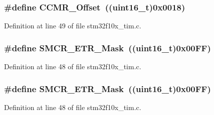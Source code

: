 \subsubsection[{\texorpdfstring{C\+C\+M\+R\+\_\+\+Offset}{CCMR_Offset}}]{\setlength{\rightskip}{0pt plus 5cm}\#define C\+C\+M\+R\+\_\+\+Offset~(({\bf uint16\+\_\+t})0x0018)}\hypertarget{group___t_i_m___private___defines_ga76469c9f56da4e7705336a6ac0248196}{}\label{group___t_i_m___private___defines_ga76469c9f56da4e7705336a6ac0248196}


Definition at line 49 of file stm32f10x\+\_\+tim.\+c.

\subsubsection[{\texorpdfstring{S\+M\+C\+R\+\_\+\+E\+T\+R\+\_\+\+Mask}{SMCR_ETR_Mask}}]{\setlength{\rightskip}{0pt plus 5cm}\#define S\+M\+C\+R\+\_\+\+E\+T\+R\+\_\+\+Mask~(({\bf uint16\+\_\+t})0x00\+F\+F)}\hypertarget{group___t_i_m___private___defines_ga43819484b70fd8f2f2aa02d4131c9841}{}\label{group___t_i_m___private___defines_ga43819484b70fd8f2f2aa02d4131c9841}


Definition at line 48 of file stm32f10x\+\_\+tim.\+c.

\subsubsection[{\texorpdfstring{S\+M\+C\+R\+\_\+\+E\+T\+R\+\_\+\+Mask}{SMCR_ETR_Mask}}]{\setlength{\rightskip}{0pt plus 5cm}\#define S\+M\+C\+R\+\_\+\+E\+T\+R\+\_\+\+Mask~(({\bf uint16\+\_\+t})0x00\+F\+F)}\hypertarget{group___t_i_m___private___defines_ga43819484b70fd8f2f2aa02d4131c9841}{}\label{group___t_i_m___private___defines_ga43819484b70fd8f2f2aa02d4131c9841}


Definition at line 48 of file stm32f10x\+\_\+tim.\+c.

